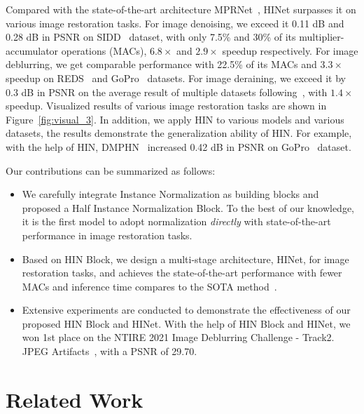 \documentclass[final]{cvpr}
\begin{document}
Compared with the state-of-the-art architecture MPRNet~\cite{zamir2021multi}, HINet surpasses it on various image restoration tasks. For image denoising, we exceed it 0.11 dB and 0.28 dB in PSNR on SIDD~\cite{abdelhamed2018high} dataset, with only 7.5\% and 30\% of its multiplier-accumulator operations (MACs), $6.8\times$ and $2.9\times$ speedup respectively. For image deblurring, we get comparable performance with 22.5\% of its MACs and $3.3\times$ speedup on REDS~\cite{nah2019ntire} and GoPro~\cite{nah2017deep} datasets. For image deraining, we exceed it by 0.3 dB in PSNR on the average result of multiple datasets following~\cite{Zamir2021MPRNet}, with $1.4\times$ speedup. Visualized results of various image restoration tasks are shown in Figure~\ref{fig:visual_3}. In addition, we apply HIN to various models and various datasets, the results demonstrate the generalization ability of HIN. For example, with the help of HIN, DMPHN~\cite{Zhang_2019_CVPR} increased 0.42 dB in PSNR on GoPro~\cite{nah2017deep} dataset. 



Our contributions can be summarized as follows:
\begin{itemize}
   \item We carefully integrate Instance Normalization as building blocks and proposed a Half Instance Normalization Block. To the best of our knowledge, it is the first model to adopt normalization \emph{directly} with state-of-the-art performance in image restoration tasks.
   \item Based on HIN Block, we design a multi-stage architecture, HINet, for image restoration tasks, and achieves the state-of-the-art performance with fewer MACs and inference time compares to the SOTA method~\cite{zamir2021multi}.
   \item Extensive experiments are conducted to demonstrate the effectiveness of our proposed HIN Block and HINet. With the help of HIN Block and HINet, we won 1st place on the NTIRE 2021 Image Deblurring Challenge - Track2. JPEG Artifacts~\cite{nah2021ntire}, with a PSNR of 29.70.
\end{itemize}

\section{Related Work}
\end{document}
